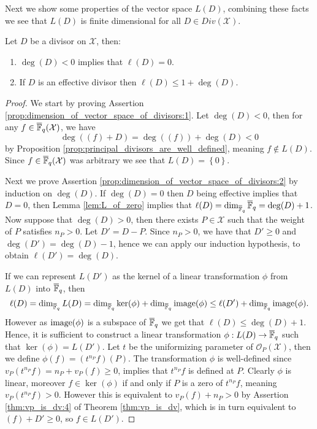 Next we show some properties of the vector space $L(D)$, combining these facts we see that $L(D)$ is finite dimensional for all $D \in Div(\mathcal{X})$.
\begin{proposition}\label{prop:dimension_of_vector_space_of_divisors}
  Let $D$ be a divisor on $\mathcal{X}$, then:
  \begin{enumerate}
    \item $\deg(D) < 0$ implies that $\ell(D) = 0$. \label{prop:dimension_of_vector_space_of_divisors:1}
    \item If $D$ is an effective divisor then $\ell(D) \leq 1 + \deg(D)$.\label{prop:dimension_of_vector_space_of_divisors:2}
  \end{enumerate}
\end{proposition}

\newpage
\begin{proof}
  We start by proving Assertion \ref{prop:dimension_of_vector_space_of_divisors:1}. Let $\deg(D) < 0$, then for any $f \in \overline{\mathbb{F}}_{q}(\mathcal{X})$, we have
  \begin{equation*}
    \deg((f) + D) = \deg((f)) + \deg(D) < 0
  \end{equation*}
  by Proposition \ref{prop:principal_divisors_are_well_defined}, meaning $f \not \in L(D)$. Since $f \in \overline{\mathbb{F}}_{q}(\mathcal{X})$ was arbitrary we see that $L(D) = \left\{0\right\}$.

  Next we prove Assertion \ref{prop:dimension_of_vector_space_of_divisors:2} by induction on $\deg(D)$. If $\deg(D) = 0$ then $D$ being effective implies that $D = 0$, then Lemma \ref{lem:L_of_zero} implies that $\ell(D) = \dim_{\overline{\mathbb{F}}_{q}} \overline{\mathbb{F}}_{q} = \deg(D) + 1$.
  Now suppose that $\deg(D) > 0$, then there exists $P \in \mathcal{X}$ such that the weight of $P$ satisfies $n_{P} > 0$. Let $D' = D - P$. Since $n_{P} > 0$, we have that $D' \geq 0$ and $\deg(D') = \deg(D) - 1$, hence we can apply our induction hypothesis, to obtain $\ell(D') = \deg(D)$.

  If we can represent $L(D')$ as the kernel of a linear transformation $\phi$ from $L(D)$ into $\overline{\mathbb{F}}_{q}$, then
  \begin{equation*}
    \ell(D) = \dim_{\overline{\mathbb{F}}_{q}} L(D) = \dim_{\overline{\mathbb{F}}_{q}} \ker(\phi) + \dim_{\overline{\mathbb{F}}_{q}} \textnormal{image}(\phi) \leq \ell(D') + \dim_{\overline{\mathbb{F}}_{q}} \textnormal{image}(\phi).
  \end{equation*}
  However as $\textnormal{image}(\phi)$ is a subspace of $\overline{\mathbb{F}}_{q}$ we get that $\ell(D) \leq \deg(D) + 1$. Hence, it is sufficient to construct a linear transformation $\phi: L(D) \to \overline{\mathbb{F}}_{q}$ such that $\ker(\phi) = L(D')$. Let $t$ be the uniformizing parameter of $\mathcal{O}_{P}(\mathcal{X})$, then we define $\phi(f) = (t^{n_{P}} f)(P)$. The transformation $\phi$ is well-defined since $v_{P}(t^{n_{P}} f) = n_{P} + v_{P}(f) \geq 0$, implies that  $t^{n_{P}} f$ is defined at $P$.
  Clearly $\phi$ is linear, moreover $f \in \ker(\phi)$ if and only if $P$ is a zero of $t^{n_P}f$, meaning $v_{P}(t^{n_{P}}f) > 0$. However this is equivalent to $v_{P}(f) + n_{P} > 0$ by Assertion \ref{thm:vp_is_dv:4} of Theorem \ref{thm:vp_is_dv}, which is in turn equivalent to $(f) + D' \geq 0$, so $f \in L(D')$.
\end{proof}
